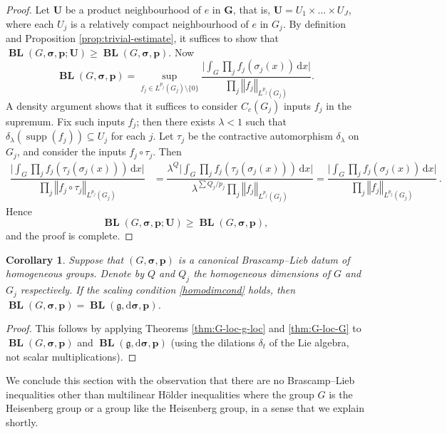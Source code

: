 \documentclass[12pt,twoside,a4paper]{amsart}
\newtheorem{cor}[thm]{Corollary}%
\theoremstyle{definition}
\theoremstyle{remark}
\numberwithin{equation}{section}
\newcommand{\Lie}[1]{\mathfrak{#1}}
\newcommand{\supp}{\operatorname{supp}}
\newcommand{\wrt}[1]{\,\mathrm{d} #1}
\newcommand{\BL}{\operatorname{\mathbf{BL}}}
\newcommand{\bss}{\boldsymbol{\sigma}}
\newcommand{\bsDs}{\boldsymbol{\mathrm{d}\sigma}}
\newcommand{\bsp}{\boldsymbol{p}}
\newcommand{\bsG}{\boldsymbol{G}}
\newcommand{\bsU}{\boldsymbol{U}}
\newcommand{\norm}[1]{\left\Vert #1 \right\Vert}
\newcommand{\biglabs}{\bigl\vert}
\newcommand{\bigrabs}{\bigr\vert}
\begin{document}
\begin{proof}
Let $\bsU$ be a product neighbourhood of $e$ in $\bsG$, that is, $\bsU = U_1 \times \dots \times U_J$, where each $U_j$ is a relatively compact neighbourhood of $e$ in $G_j$.
By definition and Proposition \ref{prop:trivial-estimate}, it suffices to show that $\BL(G,\bss ,\bsp ;\bsU)
\geq     \BL(G,\bss ,\bsp)$.
Now
\[ 
\BL(G,\bss ,\bsp) 
= \sup_{f_j\in L^{p_j}(G_j) \setminus \{0\}} 
	\frac{\biglabs \int_G \prod_j f_j (\sigma_j(x)) \wrt x \bigrabs}{\prod_j \norm{f_j}_{L^{p_j}(G_j)}}.
\]
A density argument shows that it suffices to consider $C_c(G_j)$ inputs $f_j$ in the supremum.
Fix such inputs $f_j$; then there exists $\lambda < 1$ such that $\delta_{\lambda} (\supp(f_j)) \subseteq U_j$ for each $j$.
Let $\tau_j$ be the contractive automorphism $\delta_{\lambda}$ on $G_j$, and consider the inputs $f_j \circ \tau_j$.
Then 
\[ 
\begin{aligned}
 \dfrac{\biglabs \int_G \prod_j f_j (\tau_j(\sigma_j(x))) \wrt x \bigrabs}{\prod_j \norm{f_j \circ \tau_j}_{L^{p_j}(G_j)}} 
&=  \dfrac{\lambda^{Q} \biglabs \int_G  \prod_j f_j (\tau_j(\sigma_j(x))) \wrt x \bigrabs}{\lambda^{\sum{Q_j/p_j}} \prod_j \norm{f_j }_{L^{p_j}(G_j)}} 
= \dfrac{ \biglabs \int_G \prod_j f_j (\sigma_j(x)) \wrt x \bigrabs}{\prod_j \norm{f_j}_{L^{p_j}(G_j)}} \,.
\end{aligned}
\]
Hence 
\[
\BL(G,\bss ,\bsp ; \bsU) \geq     \BL(G,\bss ,\bsp),
\]
and the proof is complete.
\end{proof}

\begin{cor} %
Suppose that $(G,\bss ,\bsp)$ is a canonical Brascamp--Lieb datum of homogeneous groups.
Denote by $Q$ and $Q_j$ the homogeneous dimensions of $G$ and $G_j$ respectively.
If the scaling condition \eqref{homodimcond} holds, then $\BL(G,\bss ,\bsp)= \BL(\Lie{g}, \bsDs ,\bsp)$.
\end{cor}

\begin{proof}
This follows by applying Theorems \ref{thm:G-loc-g-loc} and \ref{thm:G-loc-G} to $\BL(G, \bss,\bsp)$ and $\BL(\Lie{g}, \bsDs,\bsp)$ (using the dilations $\delta_t$ of the Lie algebra, not scalar multiplications).
\end{proof}

We conclude this section with the observation that there are no Brascamp--Lieb inequalities other than multilinear Hölder inequalities where the group $G$ is the Heisenberg group or a group like the Heisenberg group, in a sense that we explain shortly.
\end{document}
